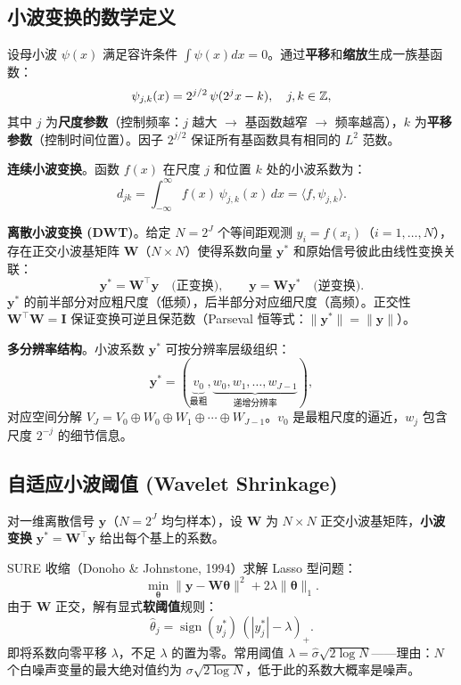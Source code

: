 \subsection{小波变换的数学定义}

设母小波 $\psi(x)$ 满足容许条件 $\int \psi(x)dx = 0$。通过\textbf{平移}和\textbf{缩放}生成一族基函数：
\begin{equation}\label{eq:wavelet_basis}
    \psi_{j,k}(x) = 2^{j/2}\,\psi(2^{j}x - k), \quad j,k \in \mathbb{Z},
\end{equation}
其中 $j$ 为\textbf{尺度参数}（控制频率：$j$ 越大 $\to$ 基函数越窄 $\to$ 频率越高），$k$ 为\textbf{平移参数}（控制时间位置）。因子 $2^{j/2}$ 保证所有基函数具有相同的 $L^2$ 范数。

\textbf{连续小波变换}。函数 $f(x)$ 在尺度 $j$ 和位置 $k$ 处的小波系数为：
\[
    d_{jk} = \int_{-\infty}^{\infty} f(x)\,\psi_{j,k}(x)\,dx = \langle f, \psi_{j,k}\rangle.
\]

\textbf{离散小波变换 (DWT)}。给定 $N = 2^J$ 个等间距观测 $y_i = f(x_i)$（$i=1,\ldots,N$），存在正交小波基矩阵 $\mathbf{W}$（$N \times N$）使得系数向量 $\mathbf{y}^*$ 和原始信号彼此由线性变换关联：
\begin{equation}\label{eq:dwt}
    \mathbf{y}^* = \mathbf{W}^{\top}\mathbf{y} \quad \text{(正变换)}, \qquad
    \mathbf{y} = \mathbf{W}\mathbf{y}^* \quad \text{(逆变换)}.
\end{equation}
$\mathbf{y}^*$ 的前半部分对应粗尺度（低频），后半部分对应细尺度（高频）。正交性 $\mathbf{W}^{\top}\mathbf{W} = \mathbf{I}$ 保证变换可逆且保范数（Parseval 恒等式：$\|\mathbf{y}^*\| = \|\mathbf{y}\|$）。

\textbf{多分辨率结构}。小波系数 $\mathbf{y}^*$ 可按分辨率层级组织：
\[
    \mathbf{y}^* = (\underbrace{v_0}_{\text{最粗}}, \underbrace{w_0, w_1, \ldots, w_{J-1}}_{\text{递增分辨率}}),
\]
对应空间分解 $V_J = V_0 \oplus W_0 \oplus W_1 \oplus \cdots \oplus W_{J-1}$。$v_0$ 是最粗尺度的逼近，$w_j$ 包含尺度 $2^{-j}$ 的细节信息。

\subsection{自适应小波阈值 (Wavelet Shrinkage)}

对一维离散信号 $\mathbf{y}$（$N=2^J$ 均匀样本），设 $\mathbf{W}$ 为 $N \times N$ 正交小波基矩阵，\textbf{小波变换} $\mathbf{y}^* = \mathbf{W}^\top \mathbf{y}$ 给出每个基上的系数。

SURE 收缩（Donoho \& Johnstone, 1994）求解 Lasso 型问题：
\[
\min_{\boldsymbol{\theta}} \|\mathbf{y} - \mathbf{W}\boldsymbol{\theta}\|^2 + 2\lambda \|\boldsymbol{\theta}\|_1.
\]
由于 $\mathbf{W}$ 正交，解有显式\textbf{软阈值}规则：
\begin{equation}\label{eq:soft_threshold}
    \hat{\theta}_j = \operatorname{sign}(y_j^*)\,(|y_j^*| - \lambda)_+.
\end{equation}
即将系数向零平移 $\lambda$，不足 $\lambda$ 的置为零。常用阈值 $\lambda = \hat{\sigma}\sqrt{2\log N}$——理由：$N$ 个白噪声变量的最大绝对值约为 $\sigma\sqrt{2\log N}$，低于此的系数大概率是噪声。

